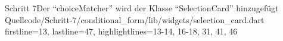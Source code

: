 \begin{alexlisting}{Schritt 7}{Der \enquote{choiceMatcher} wird der Klasse \enquote{SelectionCard} hinzugefügt}
  {Quellcode/Schritt-7/conditional_form/lib/widgets/selection_card.dart}
  {firstline=13, lastline=47, highlightlines={13-14, 16-18, 31, 41, 46}}
  \label{lst:Schritt7SelectionCard}
\end{alexlisting}






    



